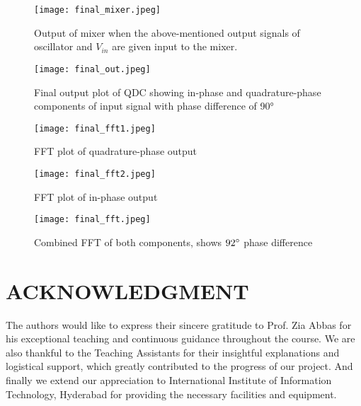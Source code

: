 \documentclass[conference]{IEEEtran}
\begin{document}
\begin{figure}[H]
\centering
\texttt{[image: final\_mixer.jpeg]}
\caption{ Output of mixer when the above-mentioned output signals of
oscillator and $V_{in}$ are given input to the mixer.}
\end{figure}

\begin{figure}[H]
\centering
\texttt{[image: final\_out.jpeg]}
\caption{Final output plot of QDC showing in-phase and
quadrature-phase components of input signal with phase difference
of 90°}
\end{figure}

\begin{figure}[H]
\centering
\texttt{[image: final\_fft1.jpeg]}
\caption{ FFT plot of quadrature-phase output}
\end{figure}

\begin{figure}[H]
\centering
\texttt{[image: final\_fft2.jpeg]}
\caption{ FFT plot of in-phase output}
\end{figure}

\begin{figure}[H]
\centering
\texttt{[image: final\_fft.jpeg]}
\caption{Combined FFT of both components, shows $92\degree$ phase difference}
\end{figure}

\section{ACKNOWLEDGMENT}
The authors would like to express their sincere gratitude to Prof. Zia Abbas for his exceptional teaching and continuous guidance throughout the course. We are also thankful to the Teaching Assistants for their insightful explanations and logistical support, which greatly contributed to the progress of our project. And finally we extend our appreciation to International Institute of Information Technology, Hyderabad for providing the necessary facilities and equipment.


 
\cite{abidi1995direct}
\cite{mancini2001opamp}
\end{document}
